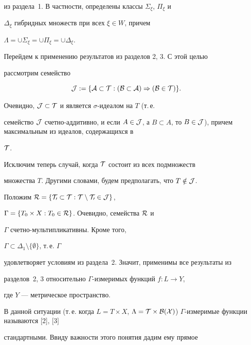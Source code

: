 из раздела~1. В частности, определены классы $\Sigma_\xi$, $\Pi_\xi$ и 


$\Delta_\xi$ гибридных множеств при всех $\xi\in W$, причем 


$\Lambda=\cup\Sigma_\xi=\cup\Pi_\xi=\cup\Delta_\xi$. 


 


Перейдем к применению результатов из разделов 2, 3. С этой целью 


рассмотрим семейство 


$$ 


\cal J:=\{A\subset T:(B\subset A)\Rightarrow(B\in\cal T)\}. 


$$ 


Очевидно, $\cal J\subset\cal T$ и является $\sigma$-идеалом на $T$ (т.\,е. 


семейство $\cal J$ счетно-аддитивно, и если $A\in\cal J$, а $B\subset 


A$, то $B\in\cal J$), причем максимальным из идеалов, содержащихся в 


$\cal T$. 


 


Исключим теперь случай, когда $\cal T$ состоит из всех подмножеств 


множества $T$. Другими словами, будем предполагать, что $T\notin\cal J$. 


Положим $\cal R=\{T_0\subset T:T\setminus T_0\in\cal J\}$, 


$\Gamma=\{T_0\times X:T_0\in\cal R\}$. Очевидно, семейства $\cal R$ и 


$\Gamma$ счетно-мультипликативны. Кроме того, 


$\Gamma\subset\Delta_1\setminus\{\emptyset\}$, т.\,е. $\Gamma$ 


удовлетворяет условиям из раздела~2. Значит, применимы все результаты из 


разделов~2, 3 относительно $\Gamma$-измеримых функций $f:L\to Y$, 


где $Y$ --- метрическое пространство. 


 


В данной ситуации (т.\,е. когда $L=T\times X$, $\Lambda=\cal 


T\times\cal B(X)$) $\Gamma$-измеримые функции называются [2], [3] 


стандартными. Ввиду важности этого понятия дадим ему прямое


